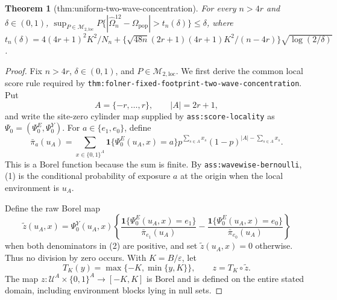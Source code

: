 \documentclass{article}
\newtheorem{theorem}{Theorem}
\begin{document}
\begin{theorem}[thm:uniform-two-wave-concentration]\label{thm:uniform-two-wave-concentration}
For every \(n>4r\) and \(\delta\in(0,1)\), \(\sup_{P\in\mathcal M_{2,\mathrm{loc}}}P\{|\widehat\Omega_n^{12}-\Omega_{\mathrm{pop}}|>t_n(\delta)\}\le\delta\), where \(t_n(\delta)=4(4r+1)^2K^2/N_n+\{\sqrt{48n}(2r+1)(4r+1)K^2/(n-4r)\}\sqrt{\log(2/\delta)}\).
\end{theorem}
\begin{proof}
Fix \(n>4r\), \(\delta\in(0,1)\), and \(P\in\mathcal M_{2,\mathrm{loc}}\).  We first derive the common local score rule required by \texttt{thm:folner-fixed-footprint-two-wave-concentration}.  Put
\[
 A=\{-r,\ldots,r\},
 \qquad |A|=2r+1,
\]
and write the site-zero cylinder map supplied by \texttt{ass:score-locality} as \(\Psi_0=(\Psi_0^E,\Psi_0^Y)\).  For \(a\in\{e_1,e_0\}\), define
\[
 \bar\pi_a(u_A)
 =\sum_{x\in\{0,1\}^{A}}
   \mathbf 1\{\Psi_0^E(u_A,x)=a\}
   p^{\sum_{s\in A}x_s}(1-p)^{|A|-\sum_{s\in A}x_s}. \tag{1}
\]
This is a Borel function because the sum is finite.  By \texttt{ass:wavewise-bernoulli}, (1) is the conditional probability of exposure \(a\) at the origin when the local environment is \(u_A\).

Define the raw Borel map
\[
 \widetilde z(u_A,x)=
 \Psi_0^Y(u_A,x)
 \left\{
  \frac{\mathbf 1\{\Psi_0^E(u_A,x)=e_1\}}{\bar\pi_{e_1}(u_A)}
  -\frac{\mathbf 1\{\Psi_0^E(u_A,x)=e_0\}}{\bar\pi_{e_0}(u_A)}
 \right\} \tag{2}
\]
when both denominators in (2) are positive, and set \(\widetilde z(u_A,x)=0\) otherwise.  Thus no division by zero occurs.  With \(K=B/\varepsilon\), let
\[
 T_K(y)=\max\{-K,\min\{y,K\}\},
 \qquad z=T_K\circ\widetilde z. \tag{3}
\]
The map \(z:\mathcal U^A\times\{0,1\}^A\to[-K,K]\) is Borel and is defined on the entire stated domain, including environment blocks lying in null sets.


\end{proof}
\end{document}
